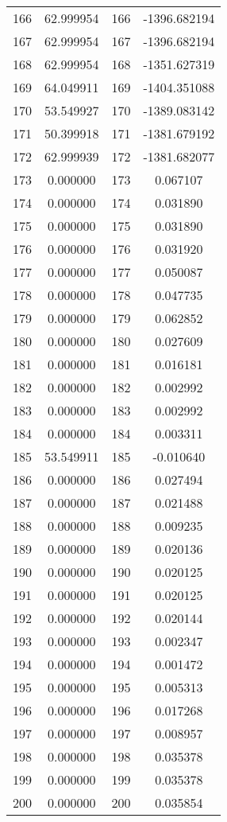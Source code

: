 \documentclass[12pt]{article}
\begin{document}
\begin{longtable}{@{}cccc@{}}
166 & 62.999954 & 166 & -1396.682194 \\
167 & 62.999954 & 167 & -1396.682194 \\
168 & 62.999954 & 168 & -1351.627319 \\
169 & 64.049911 & 169 & -1404.351088 \\
170 & 53.549927 & 170 & -1389.083142 \\
171 & 50.399918 & 171 & -1381.679192 \\
172 & 62.999939 & 172 & -1381.682077 \\
173 & 0.000000 & 173 & 0.067107 \\
174 & 0.000000 & 174 & 0.031890 \\
175 & 0.000000 & 175 & 0.031890 \\
176 & 0.000000 & 176 & 0.031920 \\
177 & 0.000000 & 177 & 0.050087 \\
178 & 0.000000 & 178 & 0.047735 \\
179 & 0.000000 & 179 & 0.062852 \\
180 & 0.000000 & 180 & 0.027609 \\
181 & 0.000000 & 181 & 0.016181 \\
182 & 0.000000 & 182 & 0.002992 \\
183 & 0.000000 & 183 & 0.002992 \\
184 & 0.000000 & 184 & 0.003311 \\
185 & 53.549911 & 185 & -0.010640 \\
186 & 0.000000 & 186 & 0.027494 \\
187 & 0.000000 & 187 & 0.021488 \\
188 & 0.000000 & 188 & 0.009235 \\
189 & 0.000000 & 189 & 0.020136 \\
190 & 0.000000 & 190 & 0.020125 \\
191 & 0.000000 & 191 & 0.020125 \\
192 & 0.000000 & 192 & 0.020144 \\
193 & 0.000000 & 193 & 0.002347 \\
194 & 0.000000 & 194 & 0.001472 \\
195 & 0.000000 & 195 & 0.005313 \\
196 & 0.000000 & 196 & 0.017268 \\
197 & 0.000000 & 197 & 0.008957 \\
198 & 0.000000 & 198 & 0.035378 \\
199 & 0.000000 & 199 & 0.035378 \\
200 & 0.000000 & 200 & 0.035854 \\

\end{longtable}
\end{document}

